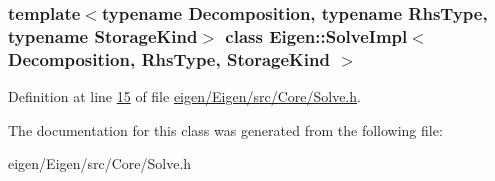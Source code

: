 \subsubsection*{template$<$typename Decomposition, typename Rhs\+Type, typename Storage\+Kind$>$\newline
class Eigen\+::\+Solve\+Impl$<$ Decomposition, Rhs\+Type, Storage\+Kind $>$}



Definition at line \hyperlink{eigen_2_eigen_2src_2_core_2_solve_8h_source_l00015}{15} of file \hyperlink{eigen_2_eigen_2src_2_core_2_solve_8h_source}{eigen/\+Eigen/src/\+Core/\+Solve.\+h}.



The documentation for this class was generated from the following file\+:\begin{DoxyCompactItemize}
\item 
eigen/\+Eigen/src/\+Core/\+Solve.\+h\end{DoxyCompactItemize}
